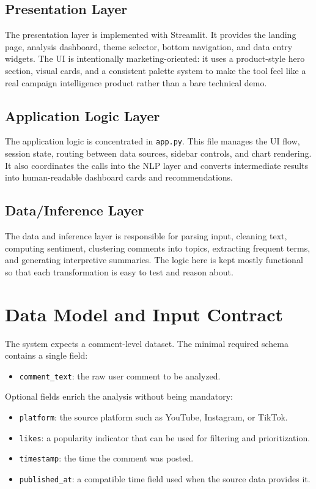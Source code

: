 \subsection{Presentation Layer}
The presentation layer is implemented with Streamlit. It provides the landing page, analysis dashboard, theme selector, bottom navigation, and data entry widgets. The UI is intentionally marketing-oriented: it uses a product-style hero section, visual cards, and a consistent palette system to make the tool feel like a real campaign intelligence product rather than a bare technical demo.

\subsection{Application Logic Layer}
The application logic is concentrated in \texttt{app.py}. This file manages the UI flow, session state, routing between data sources, sidebar controls, and chart rendering. It also coordinates the calls into the NLP layer and converts intermediate results into human-readable dashboard cards and recommendations.

\subsection{Data/Inference Layer}
The data and inference layer is responsible for parsing input, cleaning text, computing sentiment, clustering comments into topics, extracting frequent terms, and generating interpretive summaries. The logic here is kept mostly functional so that each transformation is easy to test and reason about.

\section{Data Model and Input Contract}
The system expects a comment-level dataset. The minimal required schema contains a single field:
\begin{itemize}
    \item \texttt{comment\_text}: the raw user comment to be analyzed.
\end{itemize}

Optional fields enrich the analysis without being mandatory:
\begin{itemize}
    \item \texttt{platform}: the source platform such as YouTube, Instagram, or TikTok.
    \item \texttt{likes}: a popularity indicator that can be used for filtering and prioritization.
    \item \texttt{timestamp}: the time the comment was posted.
    \item \texttt{published\_at}: a compatible time field used when the source data provides it.
\end{itemize}

